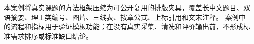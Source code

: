 \yibinclosingchapter

本案例将真实课题的方法框架压缩为可公开复用的排版夹具，覆盖长中文题目、双语摘要、理工类编号、图片、三线表、按章公式、上标引用和文末注释。
案例中的流程和指标用于验证模板功能；在没有真实采集、清洗和评价输出前，不形成标准需求排序或标准缺口结论。
